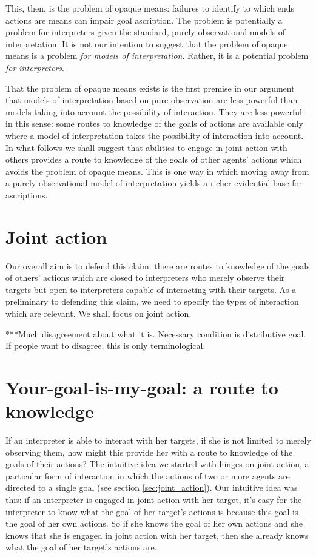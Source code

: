 \documentclass[14pt,a4paper]{extarticle}
\begin{document}
This, then, is the problem of opaque means:
failures to identify to which ends actions are means can impair goal ascription.
The problem is potentially a problem for interpreters given the standard, purely observational models of interpretation.
It is not our intention to suggest that the problem of opaque means is a problem \emph{for models of interpretation}.
Rather, it is a potential problem \emph{for interpreters}.

That the problem of opaque means exists
is the first premise in our argument
that models of interpretation based on pure observation are less powerful than models taking into account the possibility of interaction.
They are less powerful in this sense: 
some routes to knowledge of the goals of actions are available only where a model of interpretation takes the possibility of interaction into account.
In what follows we shall suggest that abilities to engage in joint action with others provides a route to knowledge of the goals of other agents' actions  which avoids the problem of opaque means.
This is one way in which moving away from a purely observational model of interpretation yields a richer evidential base for ascriptions.


\section{Joint action}
\label{sec:joint_action}
Our overall aim is to defend this claim:
there are routes to knowledge of the goals of others' actions
which are closed to
interpreters who merely observe their targets
but open to 
interpreters capable of interacting with their targets.
As a preliminary to defending this claim,
we need to specify the types of interaction which are relevant.
We shall focus on joint action.

***Much disagreement about what it is.
Necessary condition is distributive goal.
If people want to disagree, this is only terminological.



\section{Your-goal-is-my-goal: a route to knowledge}
If an interpreter is able to interact with her targets,
if she is not limited to merely observing them,
how might this provide her with a route to knowledge of the goals of their actions?
The intuitive idea we started with hinges on joint action, a particular form of interaction in which the actions of two or more agents are directed to a single goal (see section \vref{sec:joint_action}).
Our intuitive idea was this:
if an interpreter is engaged in joint action with her target, 
it's easy for the interpreter to know what the goal of her target's actions is because this goal is the goal of her own actions.
So if she knows the goal of her own actions and she knows that she is engaged in joint action with her target,
then she already knows what the goal of her target's actions are.
\end{document}
